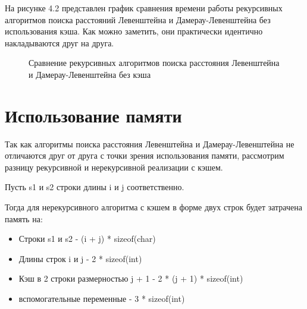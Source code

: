 На рисунке 4.2 представлен график сравнения времени работы рекурсивных алгоритмов поиска расстояний Левенштейна и Дамерау-Левенштейна без использования кэша. Как можно заметить, они практически идентично накладываются друг на друга.

\begin{figure}[H]
	\captionsetup{singlelinecheck = false, justification=centering}
	\centering
		\caption{Сравнение рекурсивных алгоритмов поиска расстояния Левенштейна и Дамерау-Левенштейна без кэша}
\end{figure}

\section{Использование памяти}

Так как алгоритмы поиска расстояния Левенштейна и Дамерау-Левенштейна не отличаются друг от друга с точки зрения использования памяти, рассмотрим разницу рекурсивной и нерекурсивной реализации с кэшем.

Пусть s1 и s2 строки длины i и j соответственно.

Тогда для нерекурсивного алгоритма с кэшем в форме двух строк будет затрачена память на:

\begin{itemize}
	\item Строки s1 и s2 - (i + j) * sizeof(char)
	\item Длины строк i и j - 2 * sizeof(int)
	\item Кэш в 2 строки размерностью j + 1 - 2 * (j + 1) * sizeof(int)
	\item вспомогательные переменные - 3 * sizeof(int)
\end{itemize}

